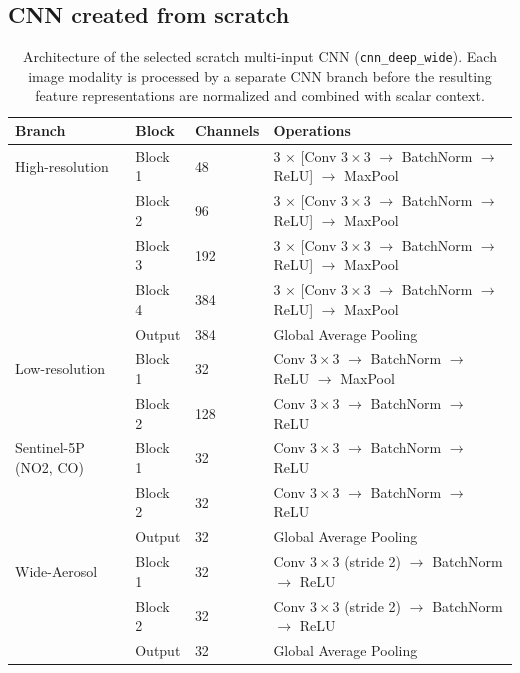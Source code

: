 \documentclass[english, a4paper, numbers=noenddot]{article}
\begin{document}
\subsection{CNN created from scratch}


\begin{table}[h]
\centering
\caption{Architecture of the selected scratch multi-input CNN (\texttt{cnn\_deep\_wide}). Each image modality is processed by a separate CNN branch before the resulting feature representations are normalized and combined with scalar context.}
\label{tab:cnn_deep_wide_architecture}
\begin{tabular}{llll}
\hline
\textbf{Branch} & \textbf{Block} & \textbf{Channels} & \textbf{Operations} \\
\hline

High-resolution &
Block 1 & 48 &
3 $\times$ [Conv $3\times3$ $\rightarrow$ BatchNorm $\rightarrow$ ReLU] $\rightarrow$ MaxPool \\
&
Block 2 & 96 &
3 $\times$ [Conv $3\times3$ $\rightarrow$ BatchNorm $\rightarrow$ ReLU] $\rightarrow$ MaxPool \\
&
Block 3 & 192 &
3 $\times$ [Conv $3\times3$ $\rightarrow$ BatchNorm $\rightarrow$ ReLU] $\rightarrow$ MaxPool \\
&
Block 4 & 384 &
3 $\times$ [Conv $3\times3$ $\rightarrow$ BatchNorm $\rightarrow$ ReLU] $\rightarrow$ MaxPool \\
&
Output & 384 &
Global Average Pooling \\
\hline

Low-resolution &
Block 1 & 32 &
Conv $3\times3$ $\rightarrow$ BatchNorm $\rightarrow$ ReLU $\rightarrow$ MaxPool \\
&
Block 2 & 128 &
Conv $3\times3$ $\rightarrow$ BatchNorm $\rightarrow$ ReLU \\
\hline

Sentinel-5P (NO2, CO) &
Block 1 & 32 &
Conv $3\times3$ $\rightarrow$ BatchNorm $\rightarrow$ ReLU \\
&
Block 2 & 32 &
Conv $3\times3$ $\rightarrow$ BatchNorm $\rightarrow$ ReLU \\
&
Output & 32 &
Global Average Pooling \\
\hline

Wide-Aerosol &
Block 1 & 32 &
Conv $3\times3$ (stride 2) $\rightarrow$ BatchNorm $\rightarrow$ ReLU \\
&
Block 2 & 32 &
Conv $3\times3$ (stride 2) $\rightarrow$ BatchNorm $\rightarrow$ ReLU \\
&
Output & 32 &
Global Average Pooling \\
\hline


\end{tabular}
\end{table}
\end{document}
